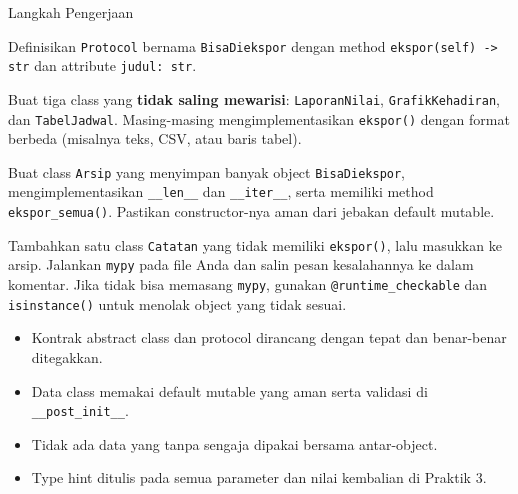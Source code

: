 \begin{langkah}{Langkah Pengerjaan}
  \item Definisikan \texttt{Protocol} bernama \texttt{BisaDiekspor} dengan method \texttt{ekspor(self) -> str} dan attribute \texttt{judul: str}.
  \item Buat tiga class yang \textbf{tidak saling mewarisi}: \texttt{LaporanNilai}, \texttt{GrafikKehadiran}, dan \texttt{TabelJadwal}. Masing-masing mengimplementasikan \texttt{ekspor()} dengan format berbeda (misalnya teks, CSV, atau baris tabel).
  \item Buat class \texttt{Arsip} yang menyimpan banyak object \texttt{BisaDiekspor}, mengimplementasikan \texttt{\_\_len\_\_} dan \texttt{\_\_iter\_\_}, serta memiliki method \texttt{ekspor\_semua()}. Pastikan constructor-nya aman dari jebakan default mutable.
  \item Tambahkan satu class \texttt{Catatan} yang tidak memiliki \texttt{ekspor()}, lalu masukkan ke arsip. Jalankan \texttt{mypy} pada file Anda dan salin pesan kesalahannya ke dalam komentar. Jika tidak bisa memasang \texttt{mypy}, gunakan \texttt{@runtime\_checkable} dan \texttt{isinstance()} untuk menolak object yang tidak sesuai.
\end{langkah}

\begin{penting}
\begin{itemize}
  \item Kontrak abstract class dan protocol dirancang dengan tepat dan benar-benar ditegakkan.
  \item Data class memakai default mutable yang aman serta validasi di \texttt{\_\_post\_init\_\_}.
  \item Tidak ada data yang tanpa sengaja dipakai bersama antar-object.
  \item Type hint ditulis pada semua parameter dan nilai kembalian di Praktik 3.
\end{itemize}
\end{penting}